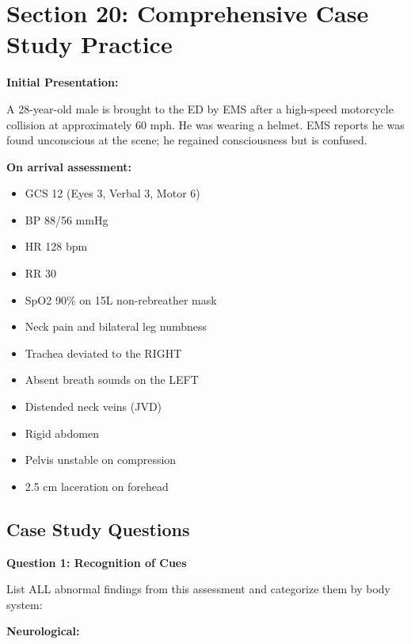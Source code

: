 \documentclass[11pt]{article}
\begin{document}
\newpage
\section*{Section 20: Comprehensive Case Study Practice}

\begin{tcolorbox}[colback=red!5!white,colframe=red!75!black,title=NGN Unfolding Case Study - Multi-System Trauma]

\textbf{Initial Presentation:}

A 28-year-old male is brought to the ED by EMS after a high-speed motorcycle collision at approximately 60 mph. He was wearing a helmet. EMS reports he was found unconscious at the scene; he regained consciousness but is confused.

\textbf{On arrival assessment:}
\begin{itemize}
    \item GCS 12 (Eyes 3, Verbal 3, Motor 6)
    \item BP 88/56 mmHg
    \item HR 128 bpm
    \item RR 30
    \item SpO2 90\% on 15L non-rebreather mask
    \item Neck pain and bilateral leg numbness
    \item Trachea deviated to the RIGHT
    \item Absent breath sounds on the LEFT
    \item Distended neck veins (JVD)
    \item Rigid abdomen
    \item Pelvis unstable on compression
    \item 2.5 cm laceration on forehead
\end{itemize}

\end{tcolorbox}

\subsection*{Case Study Questions}

\textbf{Question 1: Recognition of Cues}

List ALL abnormal findings from this assessment and categorize them by body system:

\vspace{0.3cm}
\textbf{Neurological:}

\underline{\hspace{12cm}}
\end{document}
